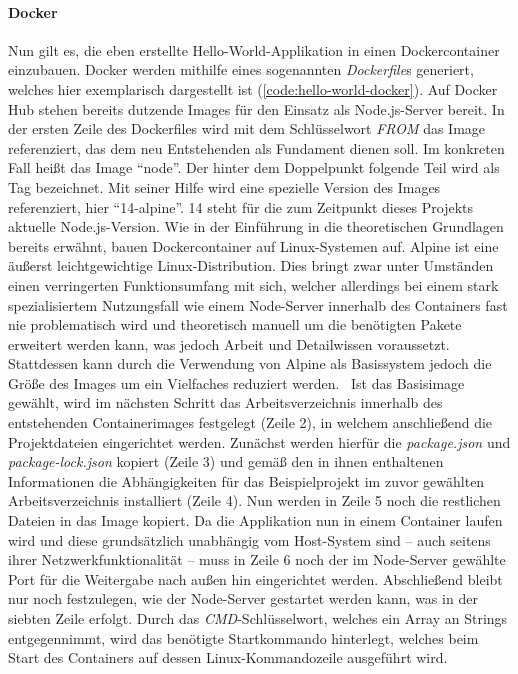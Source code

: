 \paragraph{Docker}
Nun gilt es, die eben erstellte Hello-World-Applikation in einen Dockercontainer einzubauen.
Docker werden mithilfe eines sogenannten \emph{Dockerfile}s generiert, welches hier exemplarisch dargestellt ist (\autoref{code:hello-world-docker}).
Auf Docker Hub stehen bereits dutzende Images für den Einsatz als Node.js-Server bereit.
In der ersten Zeile des Dockerfiles wird mit dem Schlüsselwort \emph{FROM} das Image referenziert, das dem neu Entstehenden als Fundament dienen soll.
Im konkreten Fall heißt das Image \enquote{node}.
Der hinter dem Doppelpunkt folgende Teil wird als Tag bezeichnet.
Mit seiner Hilfe wird eine spezielle Version des Images referenziert, hier \enquote{14-alpine}.
14 steht für die zum Zeitpunkt dieses Projekts aktuelle Node.js-Version.
Wie in der Einführung in die theoretischen Grundlagen bereits erwähnt, bauen Dockercontainer auf Linux-Systemen auf.
Alpine ist eine äußerst leichtgewichtige Linux-Distribution.
Dies bringt zwar unter Umständen einen verringerten Funktionsumfang mit sich, welcher allerdings bei einem stark spezialisiertem Nutzungsfall wie einem Node-Server innerhalb des Containers fast nie problematisch wird und theoretisch manuell um die benötigten Pakete erweitert werden kann, was jedoch Arbeit und Detailwissen voraussetzt.
Stattdessen kann durch die Verwendung von Alpine als Basissystem jedoch die Größe des Images um ein Vielfaches reduziert werden.~\cite{Bailey2017}
Ist das Basisimage gewählt, wird im nächsten Schritt das Arbeitsverzeichnis innerhalb des entstehenden Containerimages festgelegt (Zeile 2), in welchem anschließend die Projektdateien eingerichtet werden.
Zunächst werden hierfür die \emph{package.json} und \emph{package-lock.json} kopiert (Zeile 3) und gemäß den in ihnen enthaltenen Informationen die Abhängigkeiten für das Beispielprojekt im zuvor gewählten Arbeitsverzeichnis installiert (Zeile 4).
Nun werden in Zeile 5 noch die restlichen Dateien in das Image kopiert.
Da die Applikation nun in einem Container laufen wird und diese grundsätzlich unabhängig vom Host-System sind -- auch seitens ihrer Netzwerkfunktionalität -- muss in Zeile 6 noch der im Node-Server gewählte Port für die Weitergabe nach außen hin eingerichtet werden.
Abschließend bleibt nur noch festzulegen, wie der Node-Server gestartet werden kann, was in der siebten Zeile erfolgt.
Durch das \emph{CMD}-Schlüsselwort, welches ein Array an Strings entgegennimmt, wird das benötigte Startkommando hinterlegt, welches beim Start des Containers auf dessen Linux-Kommandozeile ausgeführt wird.



